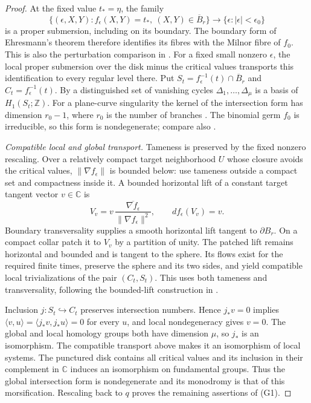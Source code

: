 \documentclass[11pt]{article}
\numberwithin{equation}{section}
\theoremstyle{definition}
\theoremstyle{remark}
\newcommand{\C}{\mathbb C}
\newcommand{\Z}{\mathbb Z}
\begin{document}
\begin{proof}
At the fixed value $t_* =\eta$, the family
\[
 \{(\epsilon,X,Y):f_\epsilon(X,Y)=t_*,\ (X,Y)\in\overline B_r\}
 \longrightarrow\{\epsilon:|\epsilon|<\epsilon_0\}
\]
is a proper submersion, including on its boundary. The boundary form of
Ehresmann's theorem therefore identifies its fibres with the Milnor fibre of
$f_0$. This is also the perturbation comparison in \cite[\S2.1,
pp.~29--31]{AGV}. For a fixed small nonzero $\epsilon$, the local proper
submersion over the disk minus the critical values transports this
identification to every regular level there. Put
$S_t=f_\epsilon^{-1}(t)\cap\overline B_r$ and $C_t=f_\epsilon^{-1}(t)$.
By \cite[Theorem~2.1, p.~31]{AGV} a distinguished set of vanishing cycles
$\Delta_1,\ldots,\Delta_\mu$ is a basis of $H_1(S_t;\Z)$.
For a plane-curve singularity the kernel of the intersection form has
dimension $r_0-1$, where $r_0$ is the number of branches
\cite[\S3.6, p.~100]{AGV}. The binomial germ $f_0$ is irreducible, so this
form is nondegenerate; compare also \cite[p.~411, Example~2]{AGV}.

\emph{Compatible local and global transport.} Tameness is preserved by the
fixed nonzero rescaling. Over a relatively compact target neighborhood $U$
whose closure avoids the critical values, $\|\nabla f_\epsilon\|$ is bounded
below: use tameness outside a compact set and compactness inside it.
A bounded horizontal lift of a constant target tangent vector $v\in\C$ is
\[
 V_v=v\,\frac{\overline{\nabla f_\epsilon}}{\|\nabla f_\epsilon\|^2},
 \qquad df_\epsilon(V_v)=v.
\]
Boundary transversality supplies a smooth horizontal lift tangent to
$\partial B_r$. On a compact collar patch it to $V_v$ by a partition of unity.
The patched lift remains horizontal and bounded and is tangent to the sphere.
Its flows exist for the required finite times, preserve the sphere and its two
sides, and yield compatible local trivializations of the pair $(C_t,S_t)$.
This uses both tameness and transversality, following the bounded-lift
construction in \cite[pp.~229--230]{Br}.

Inclusion $j:S_t\hookrightarrow C_t$ preserves intersection numbers. Hence
$j_*v=0$ implies $\langle v,u\rangle=\langle j_*v,j_*u\rangle=0$ for every $u$,
and local nondegeneracy gives $v=0$. The global and local homology groups both
have dimension $\mu$, so $j_*$ is an isomorphism. The compatible transport
above makes it an isomorphism of local systems. The punctured disk contains
all critical values and its inclusion in their complement in $\C$ induces an
isomorphism on fundamental groups. Thus the global intersection form is
nondegenerate and its monodromy is that of this morsification. Rescaling back
to $q$ proves the remaining assertions of (G1).


\end{proof}
\end{document}
